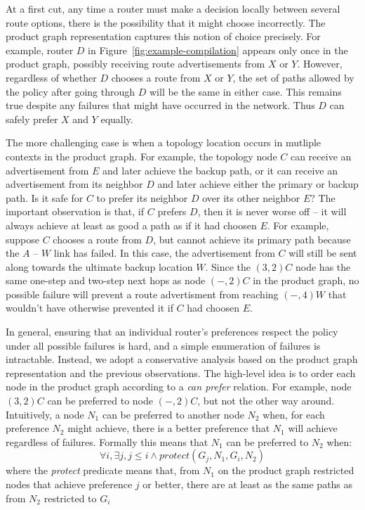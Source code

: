 At a first cut, any time a router must make a decision locally between several route options, there is the possibility that it might choose incorrectly. The product graph representation captures this notion of choice precisely. For example, router $D$ in Figure~\ref{fig:example-compilation} appears only once in the product graph, possibly receiving route advertisements from $X$ or $Y$. However, regardless of whether $D$ chooses a route from $X$ or $Y$, the set of paths allowed by the policy after going through $D$ will be the same in either case. This remains true despite any failures that might have occurred in the network. Thus $D$ can safely prefer $X$ and $Y$ equally. 

The more challenging case is when a topology location occurs in mutliple contexts in the product graph. For example, the topology node $C$ can receive an advertisement from $E$ and later achieve the backup path, or it can receive an advertisement from its neighbor $D$ and later achieve either the primary or backup path. Is it safe for $C$ to prefer its neighbor $D$ over its other neighbor $E$? The important observation is that, if $C$ prefers $D$, then it is never worse off -- it will always achieve at least as good a path as if it had choosen $E$. 
For example, suppose $C$ chooses a route from $D$, but cannot achieve its primary path because the $A$ -- $W$ link has failed. In this case, the advertisement from $C$ will still be sent along towards the ultimate backup location $W$. Since the $(3,2) C$ node has the same one-step and two-step next hops as node $(-,2) C$ in the product graph, no possible failure will prevent a route advertisment from reaching $(-,4) W$ that wouldn't have otherwise prevented it if $C$ had choosen $E$.

In general, ensuring that an individual router's preferences respect the policy under all possible failures is hard, and a simple enumeration of failures is intractable. Instead, we adopt a conservative analysis based on the product graph representation and the previous observations. The high-level idea is to order each node in the product graph according to a \textit{can prefer} relation. For example, node $(3,2) C$ can be preferred to node $(-,2) C$, but not the other way around. Intuitively, a node $N_1$ can be preferred to another node $N_2$ when, for each preference $N_2$ might achieve, there is a better preference that $N_1$ will achieve regardless of failures. Formally this means that $N_1$ can be preferred to $N_2$ when:
%
$$\forall i, \exists j, j \leq i \wedge protect(G_j, N_1, G_i, N_2)$$
%
where the \textit{protect} predicate means that, from $N_1$ on the product graph restricted nodes that achieve preference $j$ or better, there are at least as the same paths as from $N_2$ restricted to $G_i$


